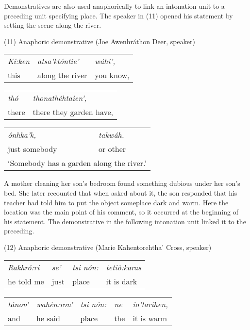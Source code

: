 \documentclass[output=paper,colorlinks,citecolor=brown
]{langscibook}
\begin{document}
Demonstratives are also used anaphorically to link an intonation unit to a preceding unit specifying place. The speaker in (11) opened his statement by setting the scene along the river.\bigskip


(11) Anaphoric demonstrative (Joe Awenhráthon Deer, speaker)\\

\begin{tabular}{lll}
\emph{Kí:ken} & \emph{atsa'któntie'} & \emph{wáhi',}\\

this & along the river & you know,
\end{tabular}\bigskip

\begin{tabular}{ll}
\emph{thó}  & \emph{thonathéhtaien',}\\

there & there they garden have,
\end{tabular}\bigskip

\begin{tabular}{ll}
\emph{ónhka'k,} & \emph{takwáh.}\\

just somebody & or other\\
\multicolumn{2}{l}{`Somebody has a garden along the river.'}
\end{tabular}\bigskip

A mother cleaning her son's bedroom found something dubious under her son's bed. She later recounted that when asked about it, the son responded that his teacher had told him to put the object someplace dark and warm. Here the location was the main point of his comment, so it occurred at the beginning of his statement. The demonstrative in the following intonation unit linked it to the preceding.\bigskip


(12) Anaphoric demonstrative (Marie Kahentorehtha' Cross, speaker)\\

\begin{tabular}{llll}
\emph{Rakhró:ri} & \emph{se'} & \emph{tsi nón:} & \emph{tetiò:karas}\\

he told me & just & place & it is dark
\end{tabular}\bigskip

\begin{tabular}{lllll}
\emph{tánon'} & \emph{wahèn:ron'} & \emph{tsi nón:} & \emph{ne} & \emph{io'taríhen,}\\
and & he said & place & the & it is warm
\end{tabular}\bigskip
\end{document}
